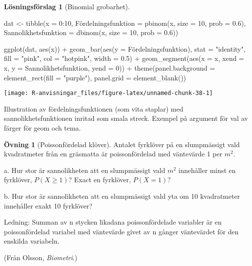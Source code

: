 \documentclass[
]{book}
\newenvironment{Shaded}{\begin{snugshade}}{\end{snugshade}}
\newcommand{\AttributeTok}[1]{\textcolor[rgb]{0.77,0.63,0.00}{#1}}
\newcommand{\DecValTok}[1]{\textcolor[rgb]{0.00,0.00,0.81}{#1}}
\newcommand{\FloatTok}[1]{\textcolor[rgb]{0.00,0.00,0.81}{#1}}
\newcommand{\FunctionTok}[1]{\textcolor[rgb]{0.00,0.00,0.00}{#1}}
\newcommand{\NormalTok}[1]{#1}
\newcommand{\OtherTok}[1]{\textcolor[rgb]{0.56,0.35,0.01}{#1}}
\newcommand{\SpecialCharTok}[1]{\textcolor[rgb]{0.00,0.00,0.00}{#1}}
\newcommand{\StringTok}[1]{\textcolor[rgb]{0.31,0.60,0.02}{#1}}
\theoremstyle{definition}
\theoremstyle{definition}
\theoremstyle{definition}
\newtheorem{exercise}{Övning}[chapter]
\theoremstyle{definition}
\newtheorem{hypothesis}{Lösningsförslag}[chapter]
\theoremstyle{remark}
\begin{document}
\begin{hypothesis}[Binomial grobarhet]
\begin{Shaded}
\begin{Highlighting}[]
\NormalTok{dat }\OtherTok{\textless{}{-}} \FunctionTok{tibble}\NormalTok{(}\AttributeTok{x =} \DecValTok{0}\SpecialCharTok{:}\DecValTok{10}\NormalTok{,}
\NormalTok{       Fördelningsfunktion }\OtherTok{=} \FunctionTok{pbinom}\NormalTok{(x, }\AttributeTok{size =} \DecValTok{10}\NormalTok{, }\AttributeTok{prob =} \FloatTok{0.6}\NormalTok{),}
       \AttributeTok{Sannolikhetsfunktion =} \FunctionTok{dbinom}\NormalTok{(x, }\AttributeTok{size =} \DecValTok{10}\NormalTok{, }\AttributeTok{prob =} \FloatTok{0.6}\NormalTok{))}

\FunctionTok{ggplot}\NormalTok{(dat, }\FunctionTok{aes}\NormalTok{(x)) }\SpecialCharTok{+}
  \FunctionTok{geom\_bar}\NormalTok{(}\FunctionTok{aes}\NormalTok{(}\AttributeTok{y =}\NormalTok{ Fördelningsfunktion), }\AttributeTok{stat =} \StringTok{"identity"}\NormalTok{, }
           \AttributeTok{fill =} \StringTok{"pink"}\NormalTok{, }\AttributeTok{col =} \StringTok{"hotpink"}\NormalTok{, }\AttributeTok{width =} \FloatTok{0.5}\NormalTok{) }\SpecialCharTok{+}
  \FunctionTok{geom\_segment}\NormalTok{(}\FunctionTok{aes}\NormalTok{(}\AttributeTok{x =}\NormalTok{ x, }\AttributeTok{xend =}\NormalTok{ x, }
                   \AttributeTok{y =}\NormalTok{ Sannolikhetsfunktion, }\AttributeTok{yend =} \DecValTok{0}\NormalTok{)) }\SpecialCharTok{+}
  \FunctionTok{theme}\NormalTok{(}\AttributeTok{panel.background =} \FunctionTok{element\_rect}\NormalTok{(}\AttributeTok{fill =} \StringTok{"purple"}\NormalTok{), }
        \AttributeTok{panel.grid =} \FunctionTok{element\_blank}\NormalTok{())}
\end{Highlighting}
\end{Shaded}

\begin{center}\texttt{[image: R-anvisningar\_files/figure-latex/unnamed-chunk-38-1]} \end{center}

Illustration av fördelningsfunktionen (som vita staplar) med sannolikhetsfunktionen inritad som smala streck. Exempel på argument för val av färger för geom och tema.
\end{hypothesis}

\begin{exercise}[Poissonfördelad klöver]
Antalet fyrklöver på en slumpmässigt vald kvadratmeter från en gräsmatta är poissonfördelad med väntevärde 1 per \(m^2\).

a. Hur stor är sannolikheten att en slumpmässigt vald \(m^2\) innehåller minst en fyrklöver, \(P(X \geq 1)\)? Exact en fyrklöver, \(P(X = 1)\)?

b. Hur stor är sannolikheten att en slumpmässigt vald yta om 10 kvadratmeter innehåller exakt 10 fyrklöver?

Ledning: Summan av n stycken likadana poissonfördelade variabler är en poissonfördelad variabel med väntevärde givet av n gånger väntevärdet för den enskilda variabeln.

(Från Olsson, \emph{Biometri}.)
\end{exercise}
\end{document}
